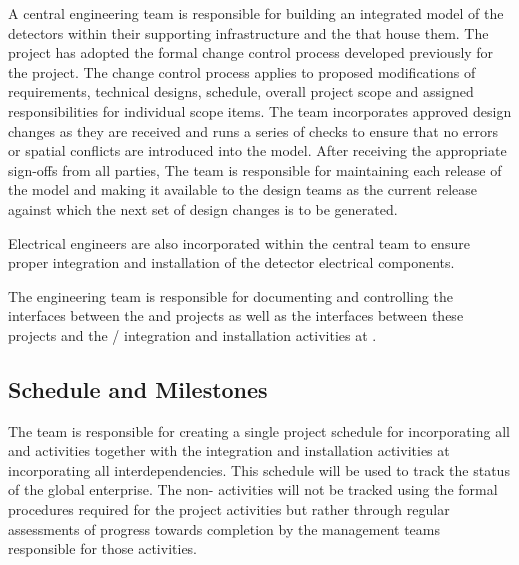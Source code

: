 
A central  engineering team is responsible for building 
an integrated model of the detectors within their supporting
infrastructure and the  that house them.  
The  project has adopted 
the formal change control process developed previously for the 
 project.  The change control process applies to 
proposed modifications of requirements, technical designs, 
schedule, overall project scope and assigned responsibilities 
for individual scope items. 
The  team incorporates approved design changes as they 
are received and runs a series of checks to ensure that no errors 
or spatial conflicts are introduced into the model. After receiving the 
appropriate sign-offs from all parties, 
The  team is responsible for maintaining  
each release  of the model and making it available to the 
design teams as the current release against which the next set 
of design changes is to be generated. 

Electrical engineers are also incorporated within the central
 team to ensure proper integration and installation 
of the detector electrical components.  

The   engineering team is responsible for documenting and
controlling the interfaces between the  and  
projects as well as the interfaces between these projects and the 
/ integration and installation activities 
at .  


\subsection{Schedule and Milestones}
\label{sec:dune_schedule}

The  team is responsible for creating a single 
project schedule for  incorporating all 
 and  activities together with the 
integration and installation activities at  
incorporating all interdependencies.  This schedule will 
be used to track the status of the global enterprise.  
  The non- activities 
will not be tracked using the formal  procedures 
required for the  project activities but rather 
through regular assessments of progress towards completion 
by the management teams responsible for those activities.  



